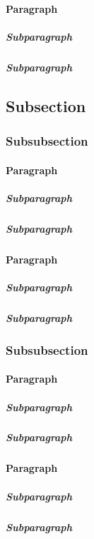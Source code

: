                 \paragraph{Paragraph}
                    \subparagraph{Subparagraph}
                    \subparagraph{Subparagraph}
        \subsection{Subsection}
            \subsubsection{Subsubsection}
                \paragraph{Paragraph}
                    \subparagraph{Subparagraph}
                    \subparagraph{Subparagraph}
                \paragraph{Paragraph}
                    \subparagraph{Subparagraph}
                    \subparagraph{Subparagraph}
            \subsubsection{Subsubsection}
                \paragraph{Paragraph}
                    \subparagraph{Subparagraph}
                    \subparagraph{Subparagraph}
                \paragraph{Paragraph}
                    \subparagraph{Subparagraph}
                    \subparagraph{Subparagraph}
        